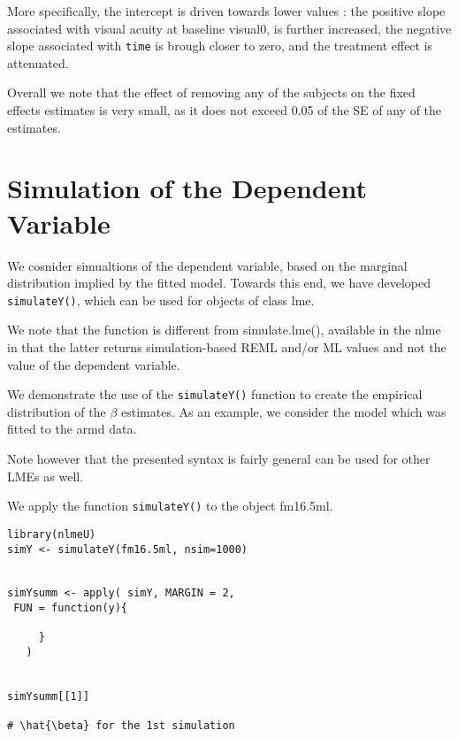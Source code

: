 \documentclass[a4paper,12pt]{article}
\begin{document}
More specifically, the intercept is driven towards lower values : the positive slope associated with visual acuity at baseline visual0, is further increased, the negative slope associated with \texttt{time} is brough closer to zero, and the treatment effect is attenuated.


Overall we note that the effect of removing any of the subjects on the fixed effects estimates is very small, as it does not exceed 0.05 of the SE of any of the  estimates.

\section{Simulation of the Dependent Variable}

We cosnider simualtions of the dependent variable, based on the marginal distribution 
implied by the fitted model.
Towards this end, we have developed \texttt{simulateY()}, which can be used for objects of class lme.

We note that the function is different from simulate.lme(), available in the nlme in that the latter returns
simulation-based REML and/or ML values and not the value of the dependent variable.

We demonstrate the use of the \texttt{simulateY()} function to create the empirical distribution of the \textbf{$\beta$} estimates.
As an example, we consider the model which was fitted to the armd data.

Note however that the presented syntax is fairly general can be used for other LMEs as well.

We apply the function \texttt{simulateY()} to the object fm16.5ml.



\begin{framed}
\begin{verbatim}
library(nlmeU)
simY <- simulateY(fm16.5ml, nsim=1000)


simYsumm <- apply( simY, MARGIN = 2, 
 FUN = function(y){

     }
   )


simYsumm[[1]]

# \hat{\beta} for the 1st simulation
\end{verbatim}
\end{framed}
\end{document}
